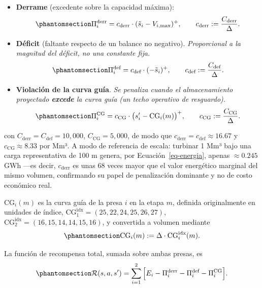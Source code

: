 \documentclass[
  spanish,
  letterpaper,
]{scrreprt}
\theoremstyle{definition}
\theoremstyle{remark}
\begin{document}
\begin{itemize}
\item
  \textbf{Derrame} (excedente sobre la capacidad máxima):
  \begin{equation}\protect\phantomsection\label{eq-penalizacion-derrame}{\Pi_i^{\text{derr}} = c_{\text{derr}}\cdot(\tilde s_i - V_{i,\max})^+, \qquad c_{\text{derr}} := \frac{C_{\text{derr}}}{\Delta}.}\end{equation}
\item
  \textbf{Déficit} (faltante respecto de un balance no negativo).
  \emph{Proporcional a la magnitud del déficit, no una constante fija.}
  \begin{equation}\protect\phantomsection\label{eq-penalizacion-deficit}{\Pi_i^{\text{def}} = c_{\text{def}}\cdot(-\tilde s_i)^+, \qquad c_{\text{def}} := \frac{C_{\text{def}}}{\Delta}.}\end{equation}
\item
  \textbf{Violación de la curva guía}. \emph{Se penaliza cuando el
  almacenamiento proyectado \textbf{excede} la curva guía (un techo
  operativo de resguardo).}
  \begin{equation}\protect\phantomsection\label{eq-penalizacion-curva-guia}{\Pi_i^{\text{CG}} = c_{\text{CG}}\cdot\big(s_i' - \text{CG}_i(m)\big)^+, \qquad c_{\text{CG}} := \frac{C_{\text{CG}}}{\Delta}.}\end{equation}
\end{itemize}

con \(C_{\text{derr}}=C_{\text{def}}=10{,}000\),
\(C_{\text{CG}}=5{,}000\), de modo que
\(c_{\text{derr}}=c_{\text{def}}\approx16.67\) y
\(c_{\text{CG}}\approx8.33\) por Mm³. A modo de referencia de escala:
turbinar 1 Mm³ bajo una carga representativa de 100 m genera, por
Ecuación~\ref{eq-energia}, apenas \(\approx0.245\) GWh ---es decir,
\(c_{\text{derr}}\) es unas \(68\) veces mayor que el valor energético
marginal del mismo volumen, confirmando su papel de penalización
dominante y no de costo económico real.

\(\text{CG}_i(m)\) es la curva guía de la presa \(i\) en la etapa \(m\),
definida originalmente en unidades de índice,
\(\text{CG}_1^{\text{idx}}=(25,22,24,25,26,27)\),
\(\text{CG}_2^{\text{idx}}=(16,15,14,14,15,16)\), y convertida a volumen
mediante
\begin{equation}\protect\phantomsection\label{eq-curva-guia-vol}{\text{CG}_i(m) := \Delta\cdot \text{CG}_i^{\text{idx}}(m).}\end{equation}

La función de recompensa total, sumada sobre ambas presas, es
\begin{equation}\protect\phantomsection\label{eq-recompensa}{\mathcal{R}(s,a,s') = \sum_{i=1}^{2}\Big[E_i - \Pi_i^{\text{derr}} - \Pi_i^{\text{def}} - \Pi_i^{\text{CG}}\Big].}\end{equation}
\end{document}
